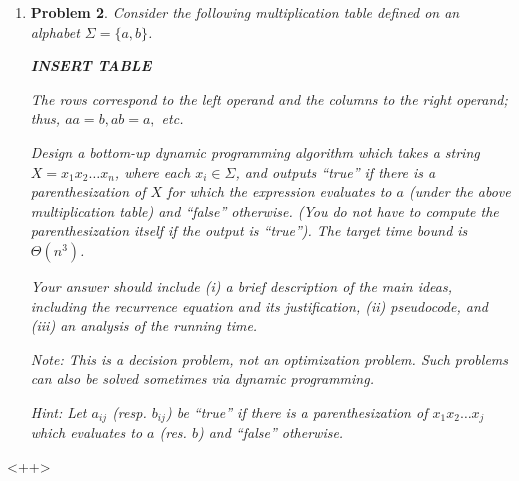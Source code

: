 \documentclass[a4paper]{article}
\newtheorem*{problem}{Problem}
\begin{document}
\begin{enumerate}
\begin{problem}
      Hint: Let $e(i,j)$ be the edit distance between $a_1, \dots, a_i$ and $b_1, \dots, b_j$.

    \end{problem}

  \item
    \begin{problem}
      Consider the following multiplication table defined on an alphabet $\Sigma = \{a, b\}$.

      \large{\textbf{INSERT TABLE}}

      The rows correspond to the left operand and the columns to the right operand; thus, $aa = b, ab = a,$ etc.

      Design a bottom-up dynamic programming algorithm which takes a string $X = x_1 x_2 \dots x_n$, where each $x_i \in \Sigma$, and outputs ``true''
      if there is a parenthesization of $X$ for which the expression evaluates to $a$ (under the above multiplication table) and ``false'' otherwise.
      (You do not have to compute the parenthesization itself if the output is ``true''). The target time bound is $\Theta(n^3)$.

      Your answer should include (i) a brief description of the main ideas, including the recurrence equation and its justification, (ii) pseudocode,
      and (iii) an analysis of the running time.

      Note: This is a decision problem, not an optimization problem. Such problems can also be solved sometimes via dynamic programming.

      Hint: Let $a_{ij}$ (resp. $b_{ij}$) be ``true'' if there is a parenthesization of $x_1 x_2 \dots x_j$ which evaluates to $a$ (res. $b$) and
      ``false'' otherwise.

    \end{problem}

\end{enumerate}<++>
\end{document}
